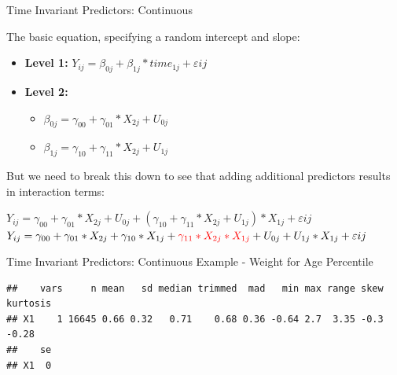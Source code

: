 \documentclass[ignorenonframetext,]{beamer}
\newenvironment{Shaded}{\begin{snugshade}}{\end{snugshade}}
\newcommand{\KeywordTok}[1]{\textcolor[rgb]{0.13,0.29,0.53}{\textbf{{#1}}}}
\newcommand{\NormalTok}[1]{{#1}}
\begin{document}
\begin{frame}{Time Invariant Predictors: Continuous}

The basic equation, specifying a random intercept and slope:\\

\begin{itemize}
  \item \textbf{Level 1:} $Y_{ij} = \beta_{0j} + \beta_{1j}*time_{1j} + \varepsilon{ij}$
  \item \textbf{Level 2:} 
    \begin{itemize} 
      \item $\beta_{0j} = \gamma_{00} + \gamma_{01}*X_{2j} + U_{0j}$
      \item $\beta_{1j} = \gamma_{10} + \gamma_{11}*X_{2j} + U_{1j}$
    \end{itemize}
\end{itemize}

But we need to break this down to see that adding additional predictors
results in interaction terms:

\(Y_{ij} = \gamma_{00} + \gamma_{01}*X_{2j} + U_{0j} + (\gamma_{10} + \gamma_{11}*X_{2j} + U_{1j})*X_{1j} + \varepsilon{ij}\)
\(Y_{ij} = \gamma_{00} + \gamma_{01}*X_{2j} + \gamma_{10}*X_{1j} + \textcolor{red}{\gamma_{11}*X_{2j}*X_{1j}} + U_{0j} + U_{1j}*X_{1j} + \varepsilon{ij}\)

\end{frame}

\begin{frame}[fragile]{Time Invariant Predictors: Continuous Example -
Weight for Age Percentile}

\begin{Shaded}
\end{Shaded}

\footnotesize

\begin{verbatim}
##    vars     n mean   sd median trimmed  mad   min max range skew kurtosis
## X1    1 16645 0.66 0.32   0.71    0.68 0.36 -0.64 2.7  3.35 -0.3    -0.28
##    se
## X1  0
\end{verbatim}

\normalsize

\end{frame}
\end{document}
